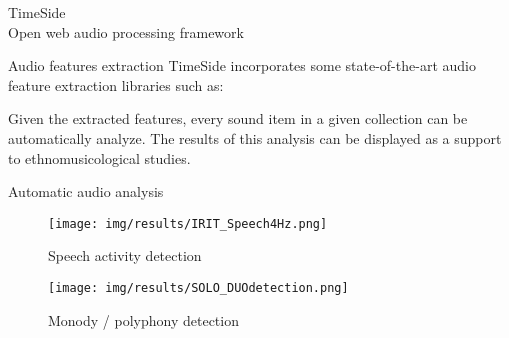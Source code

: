 \documentclass[final, hyperref, table]{beamer}
\begin{document}
\begin{frame}[containsverbatim]{}
\begin{columns}[T]
\begin{column}[T]{.49\linewidth}
\begin{block}{{\Large TimeSide}\\Open web audio processing framework}
\begin{beamerboxesrounded}%
       [shadow=true]%
       {Audio features extraction}
  TimeSide incorporates some state-of-the-art audio feature extraction
  libraries such as:


  Given the extracted features, every sound item in a given collection
  can be automatically analyze. The results of this analysis can be
  displayed as a support to ethnomusicological studies. 
\end{beamerboxesrounded}






\end{block}
\begin{block}{Automatic audio analysis}
  \begin{center}
    \begin{figure}[h]
      \centering
      \texttt{[image: img/results/IRIT\_Speech4Hz.png]}
      \caption{Speech activity detection}
  \label{fig:TS_SAD}
\end{figure}
\begin{figure}[h]
  \centering
  \texttt{[image: img/results/SOLO\_DUOdetection.png]}
  \caption{Monody / polyphony detection}
\label{fig:TS_Monopoly}
\end{figure}

  \end{center}
\end{block}
%     
 

\end{column}
\end{columns}
\end{frame}
\end{document}
